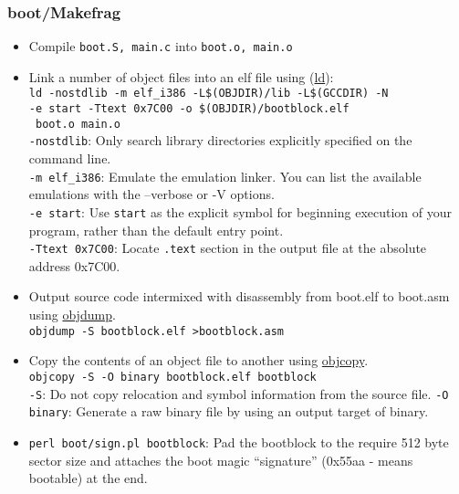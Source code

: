 \subsubsection{boot/Makefrag}
\begin{itemize}
\item Compile \verb|boot.S, main.c| into \verb|boot.o, main.o|
\item Link a number of object files into an elf file using (\href{http://linux.die.net/man/1/ld}{ld}):\\
    \verb|ld -nostdlib -m elf_i386 -L$(OBJDIR)/lib -L$(GCCDIR) -N|\\\verb|-e start -Ttext 0x7C00 -o $(OBJDIR)/bootblock.elf|\\\verb| boot.o main.o|\\
    \verb|-nostdlib|: Only search library directories explicitly specified on the command line.\\
    \verb|-m elf_i386|: Emulate the emulation linker. You can list the available emulations with the --verbose or -V options.\\
    \verb|-e start|: Use \verb|start| as the explicit symbol for beginning execution of your program, rather than the default entry point.\\
    \verb|-Ttext 0x7C00|: Locate \verb|.text| section in the output file at the absolute address 0x7C00.
\item Output source code intermixed with disassembly from boot.elf to boot.asm using \href{http://linux.die.net/man/1/objdump}{objdump}.\\ \verb|objdump -S bootblock.elf >bootblock.asm|
\item Copy the contents of an object file to another using \href{http://linux.die.net/man/1/objcopy}{objcopy}.\\
    \verb|objcopy -S -O binary bootblock.elf bootblock|\\
    \verb|-S|: Do not copy relocation and symbol information from the source file.
    \verb|-O binary|: Generate a raw binary file by using an output target of binary.

\item \verb|perl boot/sign.pl bootblock|: Pad the bootblock to the require 512 byte sector size and attaches the boot magic ``signature'' (0x55aa - means bootable) at the end.
\end{itemize}

